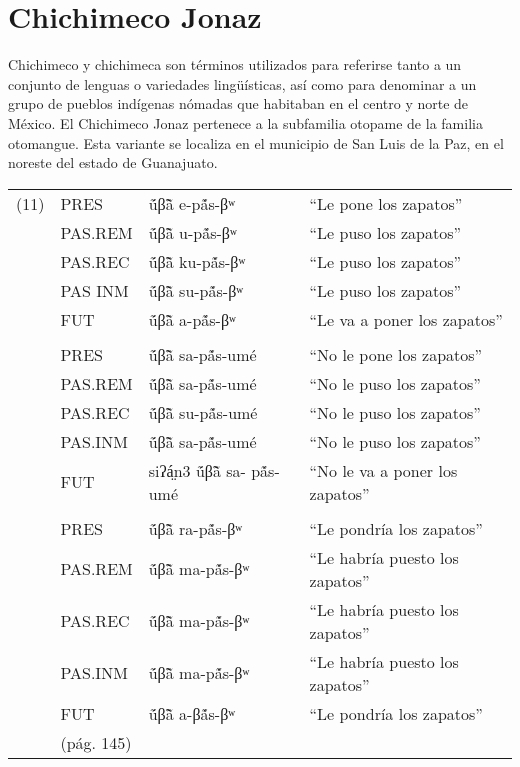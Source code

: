 \section*{Chichimeco Jonaz}

\noindent Chichimeco y chichimeca son términos utilizados para referirse tanto a un conjunto de lenguas o variedades lingüísticas, así como para denominar a un grupo de pueblos indígenas nómadas que habitaban en el centro y norte de México. El Chichimeco Jonaz pertenece a la subfamilia otopame de la familia otomangue. Esta variante se localiza en el municipio de San Luis de la Paz, en el noreste del estado de Guanajuato. \vspace{0.5cm}

{\setmainfont{Doulos SIL}
    \begin{tabular}{llll}
        (11) & PRES       & ṹβ̃ã e-pã́s-βʷ           & “Le pone los zapatos”          \\
             & PAS.REM    & ṹβ̃ã u-pã́s-βʷ           & “Le puso los zapatos”          \\
             & PAS.REC    & ṹβ̃ã ku-pã́s-βʷ          & “Le puso los zapatos”          \\
             & PAS INM    & ṹβ̃ã su-pã́s-βʷ          & “Le puso los zapatos”          \\
             & FUT        & ṹβ̃ã a-pã́s-βʷ           & “Le va a poner los zapatos”    \\
             &            &                        &                                \\
             & PRES       & ṹβ̃ã sa-pã́s-umé         & “No le pone los zapatos”       \\
             & PAS.REM    & ṹβ̃ã sa-pã́s-umé         & “No le puso los zapatos”       \\
             & PAS.REC    & ṹβ̃ã su-pã́s-umé         & “No le puso los zapatos”       \\
             & PAS.INM    & ṹβ̃ã sa-pã́s-umé         & “No le puso los zapatos”       \\
             & FUT        & siʔá̤n3 ṹβ̃ã sa- pã́s-umé & “No le va a poner los zapatos” \\
             &            &                        &                                \\
             & PRES       & ṹβ̃ã ra-pã́s-βʷ          & “Le pondría los zapatos”       \\
             & PAS.REM    & ṹβ̃ã ma-pã́s-βʷ          & “Le habría puesto los zapatos” \\
             & PAS.REC    & ṹβ̃ã ma-pã́s-βʷ          & “Le habría puesto los zapatos” \\
             & PAS.INM    & ṹβ̃ã ma-pã́s-βʷ          & “Le habría puesto los zapatos” \\
             & FUT        & ṹβ̃ã a-βã́s-βʷ           & “Le pondría los zapatos”       \\
             & (pág. 145) &                        &                                \\
    \end{tabular}
} \vspace{0.25cm}

